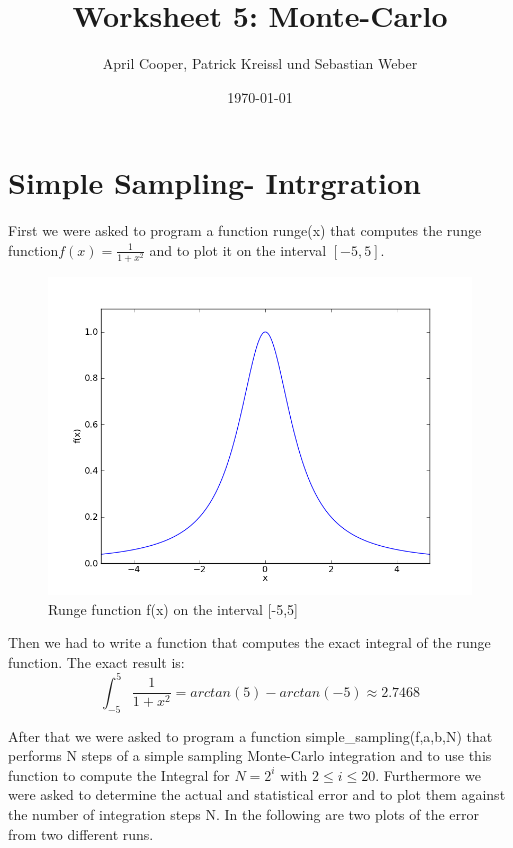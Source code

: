 \documentclass[12pt,a4paper]{scrartcl}
\author{April Cooper, Patrick Kreissl und Sebastian Weber}
\title{Worksheet 5:  Monte-Carlo}
\date{\today}
\begin{document}
\maketitle
\tableofcontents
\newpage

\section{Simple Sampling- Intrgration}
First we were asked to program a function runge(x) that computes the runge function\newline \(f(x) = \frac{1}{1+x^2}\) and to plot it on the interval $[-5,5]$.
\begin{figure}[H]
\centering
\includegraphics[width=16.0cm]{../plots/runge.png}
\caption{Runge function f(x) on the interval [-5,5]}
\label{fig:runge}
\end{figure}
Then we had to write a function that computes the exact integral of the runge function.
The exact result is: \[\int^{5}_{-5}\frac{1}{1+x^2} =  arctan(5)-arctan(-5) \approx 2.7468 \]

After that we were asked to program a function simple\_sampling(f,a,b,N) that performs N steps of a simple sampling Monte-Carlo integration and to use this function to compute the Integral for $N=2^{i}$ with $2\le i\le 20$.
Furthermore we were asked to determine the actual and statistical error and to plot them against the number of integration steps N.
In the following are two plots of the error from two different  runs. 
 
\end{document}
